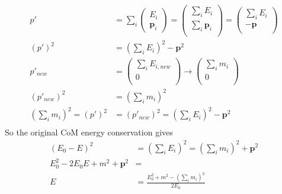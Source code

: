 \documentclass[12pt]{article}
\theoremstyle{definition}
\begin{document}
\begin{equation*}
\begin{split}
    p' &= \sum_i
        \begin{pmatrix}
            E_i \\ \bm{p}_i
        \end{pmatrix}
        =
        \begin{pmatrix}
            \sum_i E_i \\ \sum_i \bm{p}_i \\
        \end{pmatrix}
        =
        \begin{pmatrix}
            \sum_i E_i \\ - \bm{p} \\
        \end{pmatrix} \\
    (p')^2 &= \left( \sum_i E_i \right)^2 - \bm{p}^2 \\
    p'_{new}
        &=
        \begin{pmatrix}
            \sum_i E_{i,new} \\ 0 \\
        \end{pmatrix}
        \to
        \begin{pmatrix}
            \sum_i m_i \\ 0 \\
        \end{pmatrix} \\
    (p'_{new})^2 &= \left( \sum_i m_i \right)^2 \\
    \left( \sum_i m_i \right)^2 = (p')^2 &= (p'_{new})^2 = \left( \sum_i E_i \right)^2 - \bm{p}^2 \\
\end{split}
\end{equation*}
So the original CoM energy conservation gives
\begin{equation*}
\begin{split}
    (E_0 - E)^2 &= \left( \sum_i E_i \right)^2 = \left( \sum_i m_i \right)^2 + \bm{p}^2 \\
    E_0^2 - 2E_0 E + m^2 + \bm{p}^2 &= \\
    E &= \frac{E_0^2 + m^2 - \left( \sum_i m_i \right)^2}{2E_0} \\
\end{split}
\end{equation*}
\end{document}
